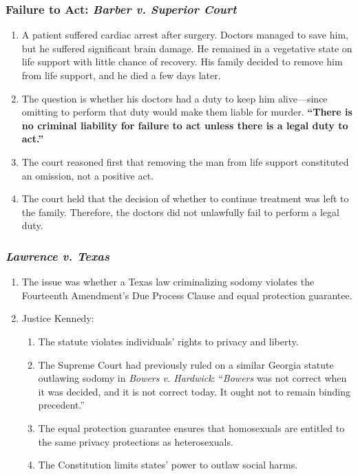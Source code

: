 \subsubsection{Failure to Act: \emph{Barber v. Superior Court}}

\begin{enumerate}
    \item A patient suffered cardiac arrest after surgery. Doctors managed to save him, but he suffered significant brain damage. He remained in a vegetative state on life support with little chance of recovery. His family decided to remove him from life support, and he died a few days later. 
    \item The question is whether his doctors had a duty to keep him alive---since omitting to perform that duty would make them liable for murder. \textbf{``There is no criminal liability for failure to act unless there is a legal duty to act.''} 
    \item The court reasoned first that removing the man from life support constituted an omission, not a positive act.
    \item The court held that the decision of whether to continue treatment was left to the family. Therefore, the doctors did not unlawfully fail to perform a legal duty.
\end{enumerate}

\subsubsection{\emph{Lawrence v. Texas}}

\begin{enumerate}
    \item The issue was whether a Texas law criminalizing sodomy violates the Fourteenth Amendment's Due Process Clause and equal protection guarantee.
    \item Justice Kennedy:
    \begin{enumerate}
        \item The statute violates individuals' rights to privacy and liberty.
        \item The Supreme Court had previously ruled on a similar Georgia statute outlawing sodomy in \emph{Bowers v. Hardwick}: ``\emph{Bowers} was not correct when it was decided, and it is not correct today. It ought not to remain binding precedent.''
        \item The equal protection guarantee ensures that homosexuals are entitled to the same privacy protections as heterosexuals.
        \item The Constitution limits states' power to outlaw social harms.
    \end{enumerate}
\end{enumerate}

